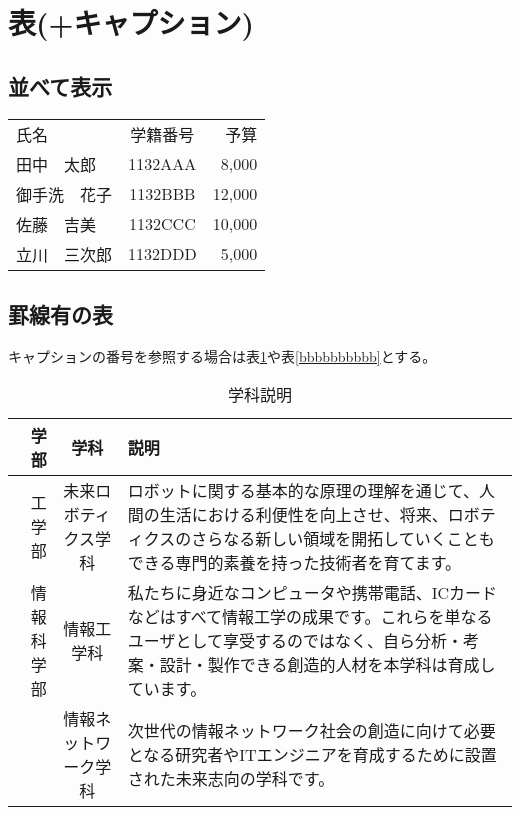 \documentclass{jsarticle}					%
\begin{document}
\pagebreak

\section{表(+キャプション)}
\subsection{並べて表示}
	\begin{tabular}{lcr}		%
		氏名 & 学籍番号& 予算\\
		田中　太郎 & 1132AAA & 8,000\\
		御手洗　花子 & 1132BBB & 12,000\\
		佐藤　吉美 & 1132CCC & 10,000\\
		立川　三次郎 & 1132DDD & 5,000\\
	\end{tabular}
	
\subsection{罫線有の表}
	キャプションの番号を参照する場合は表\ref{tab:campus}や表\ref{bbbbbbbbbb}とする。
	\begin{table}[h]				%
	\begin{center}
		\caption{学科説明}		%
	\begin{tabular}{|r|c||p{}|}		%
		\hline 					%
		学部 & 学科 & 説明\\
		\hline \hline
		工学部 & 未来ロボティクス学科 & ロボットに関する基本的な原理の理解を通じて、人間の生活における利便性を向上させ、将来、ロボティクスのさらなる新しい領域を開拓していくこともできる専門的素養を持った技術者を育てます。\\
		\hline
		情報科学部 & 情報工学科 & 私たちに身近なコンピュータや携帯電話、ICカードなどはすべて情報工学の成果です。これらを単なるユーザとして享受するのではなく、自ら分析・考案・設計・製作できる創造的人材を本学科は育成しています。\\
		\cline{2-3}				%
		 & 情報ネットワーク学科 & 次世代の情報ネットワーク社会の創造に向けて必要となる研究者やITエンジニアを育成するために設置された未来志向の学科です。\\
		 \hline
	\end{tabular}
	\label{tab:campus}					%
	\end{center}
	\end{table}
\end{document}
